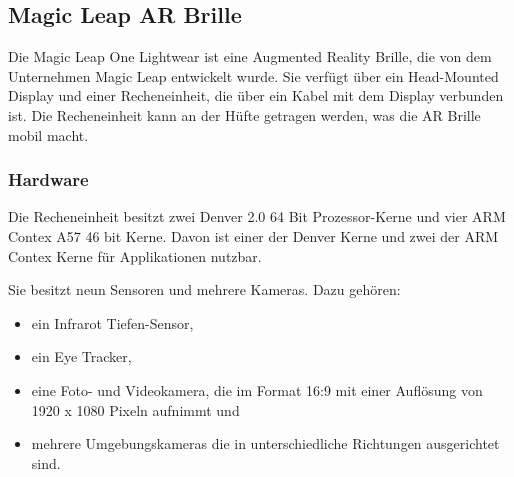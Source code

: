 %
%


\subsection{Magic Leap AR Brille}

Die Magic Leap One Lightwear ist eine Augmented Reality Brille, die von dem Unternehmen Magic Leap entwickelt wurde. Sie verfügt über ein Head-Mounted Display und einer Recheneinheit, die über ein Kabel mit dem Display verbunden ist. Die Recheneinheit kann an der Hüfte getragen werden, was die AR Brille mobil macht. 


\subsubsection{Hardware}

Die Recheneinheit besitzt zwei Denver 2.0 64 Bit Prozessor-Kerne und vier ARM Contex A57 46 bit Kerne. Davon ist einer der Denver Kerne und zwei der ARM Contex Kerne für Applikationen nutzbar.  

Sie besitzt neun Sensoren und mehrere Kameras. Dazu gehören:
\begin{itemize}
	\item ein Infrarot Tiefen-Sensor,
	\item ein Eye Tracker,
	\item eine Foto- und Videokamera, die im Format 16:9 mit einer Auflösung von 1920 x 1080 Pixeln aufnimmt und
	\item mehrere Umgebungskameras die in unterschiedliche Richtungen ausgerichtet sind. \citep{mlofficialsalespitch,mlglossary}
\end{itemize}

